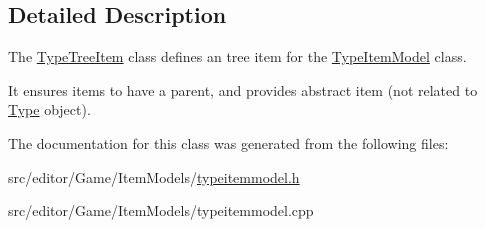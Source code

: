 \subsection{\-Detailed \-Description}
\-The \hyperlink{class_type_tree_item}{\-Type\-Tree\-Item} class defines an tree item for the \hyperlink{class_type_item_model}{\-Type\-Item\-Model} class. 

\-It ensures items to have a parent, and provides abstract item (not related to \hyperlink{class_type}{\-Type} object). 

\-The documentation for this class was generated from the following files\-:\begin{DoxyCompactItemize}
\item 
src/editor/\-Game/\-Item\-Models/\hyperlink{typeitemmodel_8h}{typeitemmodel.\-h}\item 
src/editor/\-Game/\-Item\-Models/typeitemmodel.\-cpp\end{DoxyCompactItemize}
